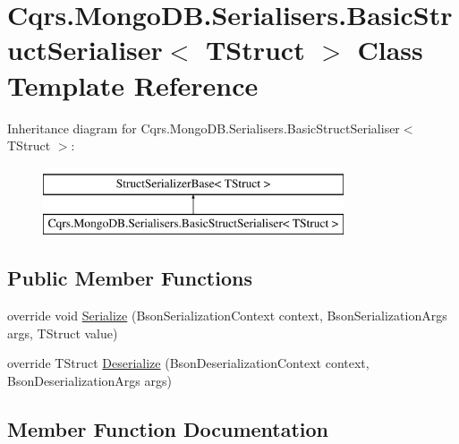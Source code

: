 \hypertarget{classCqrs_1_1MongoDB_1_1Serialisers_1_1BasicStructSerialiser}{}\section{Cqrs.\+Mongo\+D\+B.\+Serialisers.\+Basic\+Struct\+Serialiser$<$ T\+Struct $>$ Class Template Reference}
\label{classCqrs_1_1MongoDB_1_1Serialisers_1_1BasicStructSerialiser}
Inheritance diagram for Cqrs.\+Mongo\+D\+B.\+Serialisers.\+Basic\+Struct\+Serialiser$<$ T\+Struct $>$\+:\begin{figure}[H]
\begin{center}
\leavevmode
\includegraphics[height=2.000000cm]{classCqrs_1_1MongoDB_1_1Serialisers_1_1BasicStructSerialiser}
\end{center}
\end{figure}
\subsection*{Public Member Functions}
\begin{DoxyCompactItemize}
\item 
override void \hyperlink{classCqrs_1_1MongoDB_1_1Serialisers_1_1BasicStructSerialiser_afeddf8cf8fa5a761f01504795adafa9b}{Serialize} (Bson\+Serialization\+Context context, Bson\+Serialization\+Args args, T\+Struct value)
\item 
override T\+Struct \hyperlink{classCqrs_1_1MongoDB_1_1Serialisers_1_1BasicStructSerialiser_ad27304148a7a67b6c86c277254108c95}{Deserialize} (Bson\+Deserialization\+Context context, Bson\+Deserialization\+Args args)
\end{DoxyCompactItemize}


\subsection{Member Function Documentation}
\mbox{\label{classCqrs_1_1MongoDB_1_1Serialisers_1_1BasicStructSerialiser_ad27304148a7a67b6c86c277254108c95}} 
